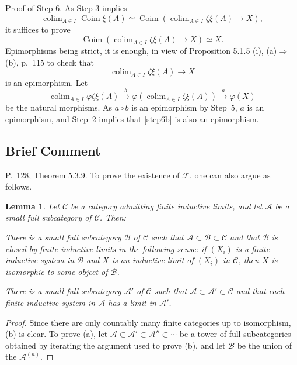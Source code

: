 \documentclass[12pt]{article}%
\newtheorem{lem}[thm]{Lemma}
\theoremstyle{remark}
\theoremstyle{definition}
\newcommand{\A}{\mathcal A}
\newcommand{\B}{\mathcal B}
\newcommand{\C}{\mathcal C}
\newcommand{\F}{\mathcal F}
\newcommand{\then}{\Rightarrow}
\DeclareMathOperator*{\colim}{colim}
\DeclareMathOperator{\Coim}{Coim}
\begin{document}
\noindent Proof of Step 6. As Step 3 implies 
$$
\colim_{A\in I}\Coim\xi(A)\simeq\Coim\left(\colim_{A\in I}\zeta\xi(A)\to X\right),
$$ 
it suffices to prove 
%
\begin{equation}\label{step6a}
\Coim\left(\colim_{A\in I}\zeta\xi(A)\to X\right)\simeq X.
\end{equation}
% 
Epimorphisms being strict, it is enough, in view of Proposition 5.1.5 (i), (a)$\then$(b), p.~115 to check that 
%
\begin{equation}\label{step6b}
\colim_{A\in I}\zeta\xi(A)\to X
\end{equation}
% 
is an epimorphism. Let 
$$
\colim_{A\in I}\varphi\zeta\xi(A)\xrightarrow{b}\varphi\left(\colim_{A\in I}\zeta\xi(A)\right)\xrightarrow{a}\varphi(X)
$$
be the natural morphisms. As $a\circ b$ is an epimorphism by Step~5, $a$ is an epimorphism, and Step~2 implies that \eqref{step6b} is also an epimorphism.


\subsection{Brief Comment}

P.~128, Theorem 5.3.9. To prove the existence of $\F$, one can also argue as follows. 

\begin{lem} 
Let $\C$ be a category admitting finite inductive limits, and let $\A$ be a small full subcategory of $\C$. Then:

 There is a small full subcategory $\B$ of $\C$ such that $\A\subset\B\subset \C$ and that $\B$ is closed by finite inductive limits in the following sense: if $(X_i)$ is a finite inductive system in $\B$ and $X$ is an inductive limit of $(X_i)$ in $\C$, then $X$ is isomorphic to some object of $\B$.

 There is a small full subcategory $\A'$ of $\C$ such that $\A\subset\A'\subset \C$ and that each finite inductive system in $\A$ has a limit in $\A'$. 
%
\end{lem} 

\begin{proof}
Since there are only countably many finite categories up to isomorphism, (b) is clear. To prove (a), let $\A\subset\A'\subset\A''\subset\cdots$ be a tower of full subcategories obtained by iterating the argument used to prove (b), and let $\B$ be the union of the $\A^{(n)}$.
\end{proof}
\end{document}
